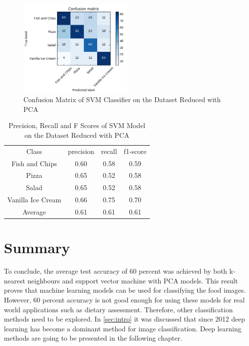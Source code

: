 \begin{figure}[h]
\centering
\includegraphics[width=0.5\textwidth]{Figures/conf_svm_pca.PNG}
\caption{Confusion Matrix of SVM Classifier on the Dataset Reduced with PCA}
\label{fig:conf_svm_pca}
\end{figure}

\begin{table}[h!]
\begin{center}
\begin{tabular}{ |c|c|c|c| } 
 \hline
 Class & precision &   recall & f1-score  \\ 
 Fish and Chips    &   0.60    &  0.58    &  0.59 \\
            Pizza   &    0.65   &   0.52   &   0.58 \\
            Salad    &   0.65    &  0.52   &   0.58  \\
Vanilla Ice Cream     &   0.66    &  0.75   &   0.70   \\ \hline
     Average     &  0.61   &   0.61   &   0.61       \\
 \hline
\end{tabular}
\caption{Precision, Recall and F Scores of SVM Model on the Dataset Reduced with PCA }
\label{table:pca}
\end{center}
\end{table}

\section{Summary}

To conclude, the average test accuracy of 60 percent was achieved by both k-nearest neighbours and support vector machine with PCA models. This result proves that machine learning models can be used for classifying the food images. However, 60 percent accuracy is not good enough for using these models for real world applications such as dietary assessment. Therefore, other classification methods need to be explored. In \autoref{sec:intro} it was discussed that since 2012 deep learning has become a dominant method for image classification.  Deep learning methods are going to be presented in the following chapter.
